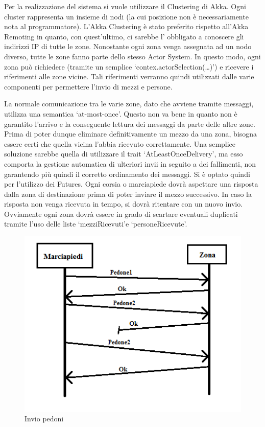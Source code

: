 \documentclass{article}
\begin{document}
\lettrine[lines=1]{P}{}er la realizzazione del sistema si vuole utilizzare il Clustering di Akka. Ogni cluster rappresenta un insieme di nodi (la cui posizione non \`{e} necessariamente nota al programmatore). L\textquoteright{}Akka Clustering \`{e} stato preferito rispetto all\textquoteright{}Akka Remoting in quanto, con quest\textquoteright{}ultimo, ci sarebbe l\textquoteright{} obbligato a conoscere gli indirizzi IP di tutte le zone. Nonostante ogni zona venga assegnata ad un nodo diverso, tutte le zone fanno parte dello stesso Actor System. In questo modo, ogni zona pu\`{o} richiedere (tramite un semplice \lq contex.actorSelection(…)\rq) e ricevere i riferimenti alle zone vicine. Tali riferimenti verranno quindi utilizzati dalle varie componenti per permettere l\textquoteright{}invio di mezzi e persone.
\par La normale comunicazione tra le varie zone, dato che avviene tramite messaggi, utilizza una semantica \lq at-most-once\rq. Questo non va bene in quanto non \`{e} garantito l\textquoteright{}arrivo e la conseguente lettura dei messaggi  da parte delle altre zone. Prima di poter dunque eliminare definitivamente un mezzo da una zona, bisogna essere certi che quella vicina l\textquoteright{}abbia ricevuto correttamente.  Una semplice soluzione sarebbe quella di utilizzare il trait \lq AtLeastOnceDelivery\rq, ma esso comporta la gestione automatica di ulteriori invii in seguito a dei fallimenti, non garantendo pi\`{u} quindi il corretto ordinamento dei messaggi. Si \`{e} optato quindi per l\textquoteright{}utilizzo dei Futures. Ogni corsia o marciapiede dovr\`{a} aspettare una risposta dalla zona di destinazione prima di poter inviare il mezzo successivo. In caso la risposta non venga ricevuta in tempo, si dovr\`{a} ritentare con un nuovo invio.  Ovviamente ogni zona dovr\`{a} essere in grado di scartare eventuali duplicati tramite l\textquoteright{}uso delle liste \lq mezziRicevuti\rq e \lq personeRicevute\rq. 
\begin{figure}[H]
\begin{center}
\includegraphics{./img/Protocollo.png}
\caption{Invio pedoni}
\label{fig:Invio pedoni}
\end{center}
\end{figure}
\end{document}
